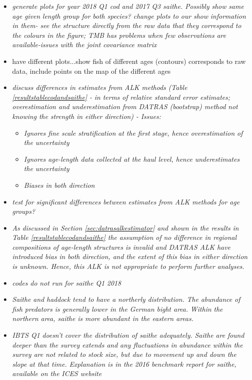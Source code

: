 \documentclass[a4paper 12pt]{article}
\numberwithin{equation}{section}
\begin{document}
\begin{itemize}
\item \emph{generate plots for year 2018 Q1 cod and 2017 Q3 saithe. Possibly show same age given length group for both species? change plots to our show information in them- see the structure directly from the raw data that they correspond to the colours in the figure; TMB has problems when few observations are available-issues with the joint covariance matrix }
\item have different plots...show fish of different ages (contours) corresponds to raw data, include points on the map of the different ages
\item \emph{discuss differences in estimates from ALK methods (Table \ref{resultstablecodandsaithe} - in terms of relative standard error estimates; overestimation and underestimation from DATRAS (bootstrap) method not knowing the strength in either direction) - Issues:}
\begin{itemize}
\item \emph{Ignores fine scale stratification at the first stage, hence overestimation of the uncertainty}
\item \emph{Ignores age-length data collected at the haul level, hence underestimates the uncertainty}
\item \emph{Biases in both direction}
\end{itemize}
\item \emph{test for significant differences between estimates from ALK methods for age groups?}
\item \emph{As discussed in Section \ref{sec:datrasalkestimator} and shown in the results in Table \ref{resultstablecodandsaithe} the assumption of no difference in regional compositions of age-length structures is invalid and DATRAS ALK have introduced bias in both direction, and the extent of this  bias in either direction is unknown. Hence, this ALK is not appropriate to perform further analyses. }
\item \emph{codes do not run for saithe Q1 2018}
\item \emph{Saithe and haddock tend to have a northerly distribution. The abundance of fish predators is generally lower in the German bight area. Within the northern area, saithe is more abundant in the eastern areas.}
\item \emph{IBTS Q1 doesn’t cover the distribution of saithe adequately. Saithe are found deeper than the survey extends and any fluctuations in abundance within the survey are not related to stock size, but due to movement up and down the slope at that time. Explanation is in the 2016 benchmark report for saithe, available on the ICES website}

\end{itemize}
\end{document}
